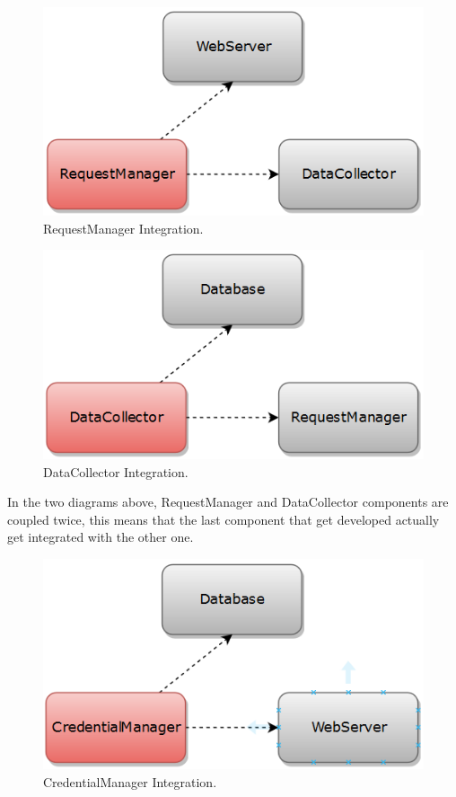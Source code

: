 \begin{figure}[H]
\centering
\includegraphics[scale=0.7]{Images/IntegrationPlanImages/fig1.png}
\caption{RequestManager Integration.}
\end{figure}

\begin{figure}[H]
\centering
\includegraphics[scale=0.7]{Images/IntegrationPlanImages/fig2.png}
\caption{DataCollector Integration.}
\end{figure}

\noindent
In the two diagrams above, RequestManager and DataCollector components are coupled twice, this means that the last component that get developed actually get integrated with the other one.

\begin{figure}[H]
\centering
\includegraphics[scale=0.7]{Images/IntegrationPlanImages/fig3.png}
\caption{CredentialManager Integration.}
\end{figure}

